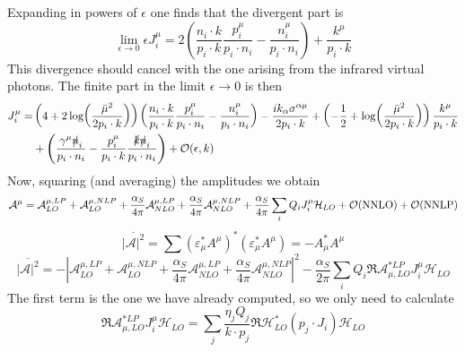 \documentclass{article}
\newcommand{\s}[1]{\slashed #1}
\begin{document}
Expanding in powers of $\epsilon$ one finds that the divergent part is
\begin{equation*}
	\lim_{\epsilon\to 0}\epsilon J_{i}^\mu = 2\left(\frac{n_i\cdot k}{p_i\cdot k}\frac{p_i^\mu}{p_i\cdot n_i}-\frac{n_i^\mu}{p_i\cdot n_i}\right)+\frac{k^\mu}{p_i\cdot k}
\end{equation*}
This divergence should cancel with the one arising from the infrared virtual photons. The finite part in the limit $\epsilon \to 0$ is then
\begin{align*}
	J_i^\mu = &\left(4+2\log(\frac{\bar{\mu}^2}{2p_i\cdot k})\right)\left(\frac{n_i\cdot k}{p_i\cdot k}\frac{p_i^\mu}{p_i\cdot n_i}-\frac{n_i^\mu}{p_i\cdot n_i}\right)
	-\frac{ik_\alpha \sigma^{\alpha\mu}}{2p_i\cdot k}
	+\left(-\frac{1}{2}+\log(\frac{\bar{\mu}^2}{2p_i\cdot k})\right)\frac{k^\mu}{p_i\cdot k}\\&
	+\left(\frac{\gamma^\mu \s{n}_i}{p_i\cdot n_i}-\frac{p_i^\mu}{p_i\cdot k}\frac{\s{k}\s{n}_i}{p_i\cdot n_i}\right) + \order{\epsilon, k}
\end{align*}
Now, squaring (and averaging) the amplitudes we obtain
\begin{equation*}
	\mathcal{A}^\mu = \mathcal{A}^{\mu,LP}_{LO} + \mathcal{A}^{\mu,NLP}_{LO} + \frac{\alpha_S}{4\pi}\mathcal{A}^{\mu,LP}_{NLO} + \frac{\alpha_S}{4\pi}\mathcal{A}^{\mu,NLP}_{NLO} + \frac{\alpha_S}{4\pi}\sum_i Q_i J_i^\mu \mathcal{H}_{LO} + \order{\mathrm{NNLO}} + \order{\mathrm{NNLP}}
\end{equation*}
\begin{equation*}
	\overline{|\mathcal{A}|^2} = \sum (\varepsilon^*_\mu A^\mu)^*(\varepsilon^*_\mu A^\mu) = -A_\mu^*A^\mu
\end{equation*}
\begin{equation}
	\overline{|\mathcal{A}|^2} = -\left|\mathcal{A}^{\mu,LP}_{LO} + \mathcal{A}^{\mu,NLP}_{LO} + \frac{\alpha_S}{4\pi}\mathcal{A}^{\mu,LP}_{NLO} + \frac{\alpha_S}{4\pi}\mathcal{A}^{\mu,NLP}_{NLO}\right|^2 - \frac{\alpha_S}{2\pi}\sum_i Q_i\Re{\mathcal{A}_{\mu,LO}^{*LP}J^\mu_{i} \mathcal{H}_{LO}}
\end{equation}
The first term is the one we have already computed, so we only need to calculate
\begin{equation}
	\Re{\mathcal{A}_{\mu,LO}^{*LP}J^\mu_{i} \mathcal{H}_{LO}} = \sum_j\frac{\eta_j Q_j}{k\cdot p_j}\Re{\mathcal{H}^*_{LO}(p_j\cdot J_i)\mathcal{H}_{LO}}
\end{equation}
\end{document}
